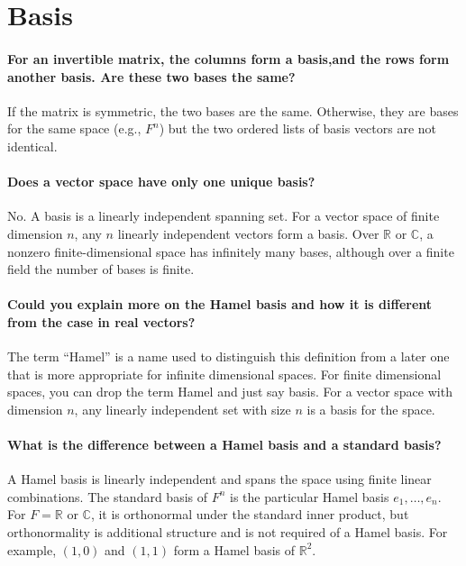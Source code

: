 \documentclass[10pt,english]{article}
\begin{document}
\section{Basis}

\paragraph{For an invertible matrix, the columns form a basis,and the rows form another basis. Are these two bases the same?}

If the matrix is symmetric, the two bases are the same.
Otherwise, they are bases for the same space (e.g., $F^n$) but the two ordered lists of basis vectors are not identical.


\paragraph{Does a vector space have only one unique basis?}

No. A basis is a linearly independent spanning set.
For a vector space of finite dimension $n$, any $n$ linearly independent vectors form a basis.
Over $\mathbb{R}$ or $\mathbb{C}$, a nonzero finite-dimensional space has infinitely many bases, although over a finite field the number of bases is finite.


\paragraph{Could you explain more on the Hamel basis and how it is different from the case in real vectors?}
The term ``Hamel'' is a name used to distinguish this definition from a later one that is more appropriate for infinite dimensional spaces.  For finite dimensional spaces, you can drop the term Hamel and just say basis.
For a vector space with dimension $n$, any linearly independent set with size $n$ is a basis for the space.


\paragraph{What is the difference between a Hamel basis and a standard basis?}

A Hamel basis is linearly independent and spans the space using finite linear combinations.
The standard basis of $F^n$ is the particular Hamel basis $e_1,\ldots,e_n$.
For $F=\mathbb{R}$ or $\mathbb{C}$, it is orthonormal under the standard inner product, but orthonormality is additional structure and is not required of a Hamel basis.
For example, $(1,0)$ and $(1,1)$ form a Hamel basis of $\mathbb{R}^2$.
\end{document}
